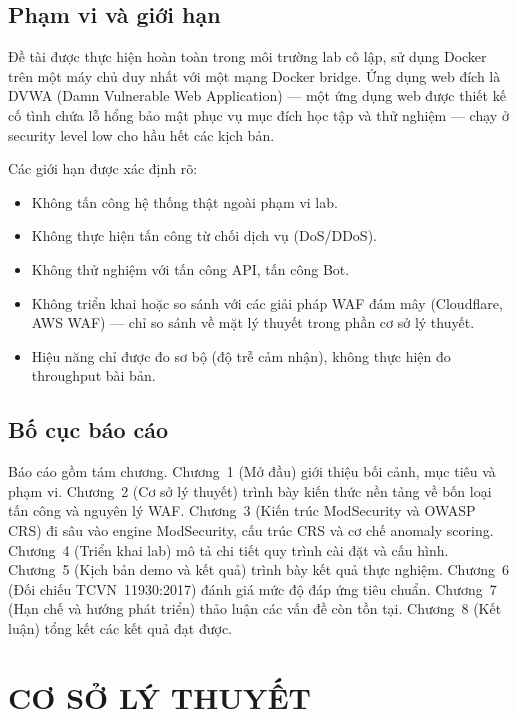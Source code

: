 \documentclass[12pt,a4paper,twoside]{report}
\begin{document}
\section{Phạm vi và giới hạn}

Đề tài được thực hiện hoàn toàn trong môi trường lab cô lập, sử dụng Docker trên một máy chủ duy nhất với một mạng Docker bridge. Ứng dụng web đích là DVWA (Damn Vulnerable Web Application) --- một ứng dụng web được thiết kế cố tình chứa lỗ hổng bảo mật phục vụ mục đích học tập và thử nghiệm --- chạy ở security level low cho hầu hết các kịch bản.

Các giới hạn được xác định rõ:
\begin{itemize}
    \item Không tấn công hệ thống thật ngoài phạm vi lab.
    \item Không thực hiện tấn công từ chối dịch vụ (DoS/DDoS).
    \item Không thử nghiệm với tấn công API, tấn công Bot.
    \item Không triển khai hoặc so sánh với các giải pháp WAF đám mây (Cloudflare, AWS WAF) --- chỉ so sánh về mặt lý thuyết trong phần cơ sở lý thuyết.
    \item Hiệu năng chỉ được đo sơ bộ (độ trễ cảm nhận), không thực hiện đo throughput bài bản.
\end{itemize}

\section{Bố cục báo cáo}

Báo cáo gồm tám chương. Chương~1 (Mở đầu) giới thiệu bối cảnh, mục tiêu và phạm vi. Chương~2 (Cơ sở lý thuyết) trình bày kiến thức nền tảng về bốn loại tấn công và nguyên lý WAF. Chương~3 (Kiến trúc ModSecurity và OWASP CRS) đi sâu vào engine ModSecurity, cấu trúc CRS và cơ chế anomaly scoring. Chương~4 (Triển khai lab) mô tả chi tiết quy trình cài đặt và cấu hình. Chương~5 (Kịch bản demo và kết quả) trình bày kết quả thực nghiệm. Chương~6 (Đối chiếu TCVN~11930:2017) đánh giá mức độ đáp ứng tiêu chuẩn. Chương~7 (Hạn chế và hướng phát triển) thảo luận các vấn đề còn tồn tại. Chương~8 (Kết luận) tổng kết các kết quả đạt được.

\chapter{CƠ SỞ LÝ THUYẾT}
\end{document}
